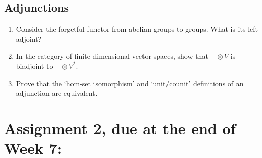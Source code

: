\documentclass[12pt]{amsart}
\begin{document}
\subsection{Adjunctions}
\begin{enumerate}
\item Consider the forgetful functor from abelian groups to groups. What is its left adjoint?
\item In the category of finite dimensional vector spaces, show that $- \otimes V$ is biadjoint to $- \otimes V^*$.
\item Prove that the `hom-set isomorphism' and `unit/counit' definitions of an adjunction are equivalent.
\end{enumerate}


\section{Assignment 2, due at the end of Week 7:}
\end{document}
